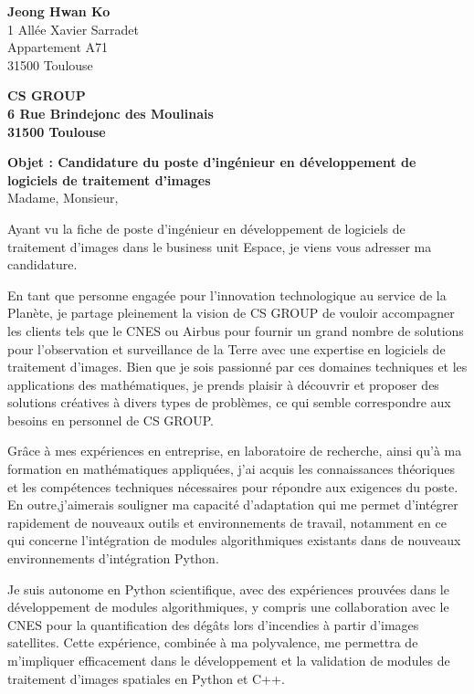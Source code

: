 \documentclass[11pt, a4paper, sans]{article}
\begin{document}
\thispagestyle{empty}
{\raggedright
\textbf{Jeong Hwan Ko}\\1 Allée Xavier Sarradet\\ Appartement A71\\31500 Toulouse}

{\raggedleft
\textbf{CS GROUP\\ 6 Rue Brindejonc des Moulinais\\ 31500 Toulouse\\}
\vspace{5mm}
\raggedright
\textbf{Objet : Candidature du poste d'ingénieur en développement de logiciels de traitement d'images\\}
\vspace{5mm}
\justifying
Madame, Monsieur,

Ayant vu la fiche de poste d'ingénieur en développement de logiciels de traitement d'images dans le business unit Espace, je viens vous adresser ma candidature.

En tant que personne engagée pour l'innovation technologique au service de la Planète, je partage pleinement la vision de CS GROUP de vouloir accompagner les clients tels que le CNES ou Airbus pour fournir un grand nombre de solutions pour l'observation et surveillance de la Terre avec une expertise en logiciels de traitement d'images. Bien que je sois passionné par ces domaines techniques et les applications des mathématiques, je prends plaisir à  découvrir et proposer des solutions créatives à divers types de problèmes, ce qui semble correspondre aux besoins en personnel de CS GROUP.

Grâce à mes expériences en entreprise, en laboratoire de recherche, ainsi qu'à ma formation en mathématiques appliquées, j'ai acquis les connaissances théoriques et les compétences techniques nécessaires pour répondre aux exigences du poste. En outre,j'aimerais souligner ma capacité d'adaptation qui me permet d'intégrer rapidement de nouveaux outils et environnements de travail, notamment en ce qui concerne l'intégration de modules algorithmiques existants dans de nouveaux environnements d'intégration Python.

Je suis autonome en Python scientifique, avec des expériences prouvées dans le développement de modules algorithmiques, y compris une collaboration avec le CNES pour la quantification des dégâts lors d'incendies à partir d'images satellites. Cette expérience, combinée à ma polyvalence, me permettra de m'impliquer efficacement dans le développement et la validation de modules de traitement d'images spatiales en Python et C++.

}
\end{document}
